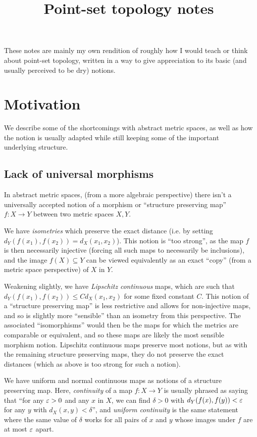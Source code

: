 \documentclass[11pt]{article}
\title{Point-set topology notes}
\begin{document}
\maketitle
These notes are mainly my own rendition of roughly how I would teach or think about point-set topology, written in a way to give appreciation to its basic (and usually perceived to be dry) notions. 
\tableofcontents
\np
\section{Motivation}
We describe some of the shortcomings with abstract metric spaces, as well as how the notion is usually adapted while still keeping some of the important underlying structure.
\subsection{Lack of universal morphisms}
In abstract metric spaces, (from a more algebraic perspective) there isn't a universally accepted notion of a morphism or ``structure preserving map'' $f : X \to Y$ between two metric spaces $X, Y$.

We have \emph{isometries} which preserve the exact distance (i.e. by setting $d_Y(f(x_1), f(x_2)) = d_X(x_1, x_2)$). This notion is ``too strong'', as the map $f$ is then necessarily injective (forcing all such maps to necessarily be inclusions), and the image $f(X) \subseteq Y$ can be viewed equivalently as an exact ``copy'' (from a metric space perspective) of $X$ in $Y$.

Weakening slightly, we have \emph{Lipschitz continuous} maps, which are such that $d_Y(f(x_1), f(x_2)) \leq Cd_X(x_1, x_2)$ for some fixed constant $C$. This notion of a ``structure preserving map'' is less restrictive and allows for non-injective maps, and so is slightly more ``sensible'' than an isometry from this perspective. The associated ``isomorphisms'' would then be the maps for which the metrics are comparable or equivalent, and so these maps are likely the most sensible morphism notion. Lipschitz continuous maps preserve most notions, but as with the remaining structure preserving maps, they do not preserve the exact distances (which as above is too strong for such a notion).

We have uniform and normal continuous maps as notions of a structure preserving map. Here, \emph{continuity} of a map $f : X \to Y$ is usually phrased as saying that ``for any $\varepsilon > 0$ and any $x$ in $X$, we can find $\delta > 0$ with $d_Y(f(x), f(y)) < \varepsilon$ for any $y$ with $d_X(x, y) < \delta$'', and \emph{uniform continuity} is the same statement where the same value of $\delta$ works for all pairs of $x$ and $y$ whose images under $f$ are at most $\varepsilon$ apart. 
\end{document}
